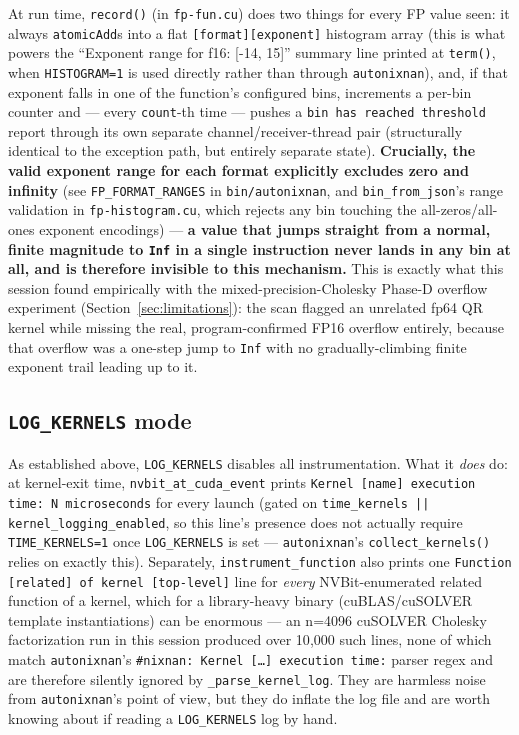 \documentclass[11pt]{article}
\begin{document}
At run time, \texttt{record()} (in \texttt{fp-fun.cu}) does two things
for every FP value seen: it always \texttt{atomicAdd}s into a flat
\texttt{[format][exponent]} histogram array (this is what powers the
``Exponent range for f16: [-14, 15]'' summary line printed at
\texttt{term()}, when \texttt{HISTOGRAM=1} is used directly rather than
through \texttt{autonixnan}), and, if that exponent falls in one of the
function's configured bins, increments a per-bin counter and --- every
\texttt{count}-th time --- pushes a \texttt{bin has reached threshold}
report through its own separate channel/receiver-thread pair
(structurally identical to the exception path, but entirely separate
state). \textbf{Crucially, the valid exponent range for each format
explicitly excludes zero and infinity} (see \texttt{FP\_FORMAT\_RANGES} in
\texttt{bin/autonixnan}, and \texttt{bin\_from\_json}'s range validation in
\texttt{fp-histogram.cu}, which rejects any bin touching the
all-zeros/all-ones exponent encodings) --- \textbf{a value that jumps
straight from a normal, finite magnitude to \texttt{Inf} in a single
instruction never lands in any bin at all, and is therefore invisible to
this mechanism.} This is exactly what this session found empirically
with the mixed-precision-Cholesky Phase-D overflow experiment
(Section~\ref{sec:limitations}): the scan flagged an unrelated fp64 QR
kernel while missing the real, program-confirmed FP16 overflow entirely,
because that overflow was a one-step jump to \texttt{Inf} with no
gradually-climbing finite exponent trail leading up to it.

\subsection{\texttt{LOG\_KERNELS} mode}
\label{sec:logkernels}

As established above, \texttt{LOG\_KERNELS} disables all instrumentation.
What it \emph{does} do: at kernel-exit time,
\texttt{nvbit\_at\_cuda\_event} prints
\texttt{Kernel [name] execution time: N microseconds} for every launch
(gated on \texttt{time\_kernels || kernel\_logging\_enabled}, so this
line's presence does not actually require \texttt{TIME\_KERNELS=1} once
\texttt{LOG\_KERNELS} is set --- \texttt{autonixnan}'s
\texttt{collect\_kernels()} relies on exactly this). Separately,
\texttt{instrument\_function} also prints one
\texttt{Function [related] of kernel [top-level]} line for \emph{every}
NVBit-enumerated related function of a kernel, which for a library-heavy
binary (cuBLAS/cuSOLVER template instantiations) can be enormous --- an
n=4096 cuSOLVER Cholesky factorization run in this session produced over
10{,}000 such lines, none of which match \texttt{autonixnan}'s
\texttt{\#nixnan: Kernel [\ldots] execution time:} parser regex and are
therefore silently ignored by \texttt{\_parse\_kernel\_log}. They are
harmless noise from \texttt{autonixnan}'s point of view, but they do
inflate the log file and are worth knowing about if reading a
\texttt{LOG\_KERNELS} log by hand.
\end{document}
